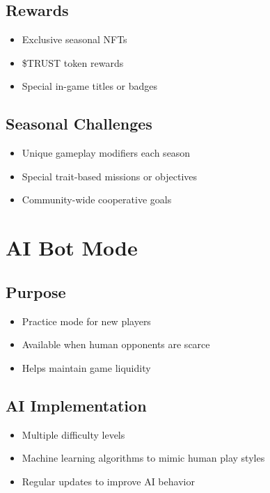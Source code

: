 \documentclass[]{article}
\begin{document}
\subsection{Rewards}

\begin{itemize}
\item Exclusive seasonal NFTs
\item \$TRUST token rewards
\item Special in-game titles or badges
\end{itemize}

\subsection{Seasonal Challenges}

\begin{itemize}
\item Unique gameplay modifiers each season
\item Special trait-based missions or objectives
\item Community-wide cooperative goals
\end{itemize}

\section{AI Bot Mode}

\subsection{Purpose}

\begin{itemize}
\item Practice mode for new players
\item Available when human opponents are scarce
\item Helps maintain game liquidity
\end{itemize}

\subsection{AI Implementation}

\begin{itemize}
\item Multiple difficulty levels
\item Machine learning algorithms to mimic human play styles
\item Regular updates to improve AI behavior
\end{itemize}
\end{document}
